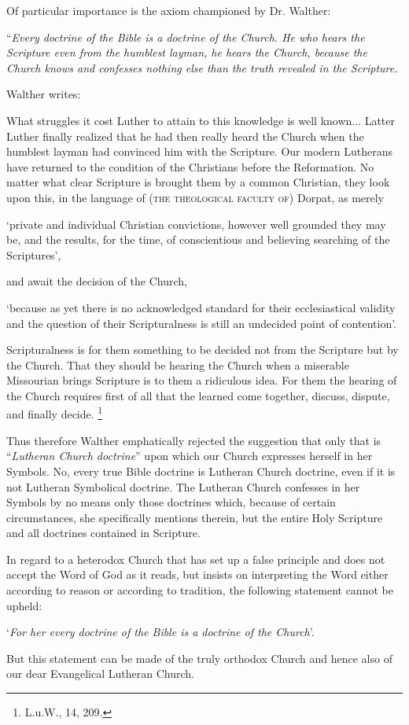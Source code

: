 Of particular importance is the axiom championed by Dr. Walther: \begin{displayquote}“\textit{Every doctrine of the Bible is a doctrine of the Church.  He who hears the Scripture even from the humblest layman, he hears the Church, because the Church knows and confesses nothing else than the truth revealed in the Scripture.}\end{displayquote}  Walther writes:\begin{fancyquotes} What struggles it cost Luther to attain to this knowledge is well known...  Latter Luther finally realized that he had then really heard the Church when the humblest layman had convinced him with the Scripture.  Our modern Lutherans have returned to the condition of the Christians before the Reformation.  No matter what clear Scripture is brought them by a common Christian, they look upon this, in the language of {\scriptsize\textsc{(the theological faculty of)}} Dorpat, as merely \begin{displayquote}{\footnotesize ‘private and individual Christian convictions, however well grounded they may be, and the results, for the time, of conscientious and believing searching of the Scriptures’,}\end{displayquote} and await the decision of the Church, \begin{displayquote}{\footnotesize ‘because as yet there is no acknowledged standard for their ecclesiastical validity and the question of their Scripturalness is still an undecided point of contention’.}\end{displayquote}  Scripturalness is for them something to be decided not from the Scripture but by the Church.  That they should be hearing the Church when a miserable Missourian brings Scripture is to them a ridiculous idea.  For them the hearing of the Church requires first of all that the learned come together, discuss, dispute, and finally decide. \footnote{L.u.W., 14, 209.}
\end{fancyquotes} 

                Thus therefore Walther emphatically rejected the suggestion that only that is “\textit{Lutheran Church doctrine}” upon which our Church expresses herself in her Symbols.  No, every true Bible doctrine is Lutheran Church doctrine, even if it is not Lutheran Symbolical doctrine.  The Lutheran Church confesses in her Symbols by no means only those doctrines which, because of certain circumstances, she specifically mentions therein, but the entire Holy Scripture and all doctrines contained in Scripture.  \begin{fancyquotes}In regard to a heterodox Church that has set up a false principle and does not accept the Word of God as it reads, but insists on interpreting the Word either according to reason or according to tradition, the following statement cannot be upheld: \begin{displayquote}‘\textit{For her every doctrine of the Bible is a doctrine of the Church}’.\end{displayquote}  But this statement can be made of the truly orthodox Church and hence also of our dear Evangelical Lutheran Church.\end{fancyquotes}

